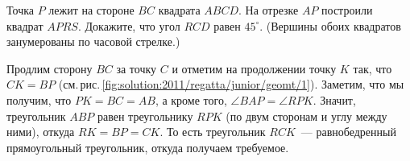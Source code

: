 \problem
Точка $P$ лежит на стороне $BC$ квадрата $ABCD$.
На отрезке $AP$ построили квадрат $APRS$.
Докажите, что угол $RCD$ равен $45^\circ$.
(Вершины обоих квадратов занумерованы по часовой стрелке.)



%
\label{solution:2011/regatta/junior/geomt/1}%
Продлим сторону $BC$ за точку $C$ и отметим на продолжении точку $K$ так, что
$C K = B P$
(см.\,рис.\,\ref{fig:solution:2011/regatta/junior/geomt/1}).
Заметим, что мы получим, что $PK = BC = AB$, а кроме того,
$\angle BAP = \angle RPK$.
Значит, треугольник $ABP$ равен треугольнику $RPK$
(по двум сторонам и углу между ними),
откуда $RK = BP = CK$.
То есть треугольник $RCK$~--- равнобедренный прямоугольный треугольник, откуда
получаем требуемое.

\endproblem
